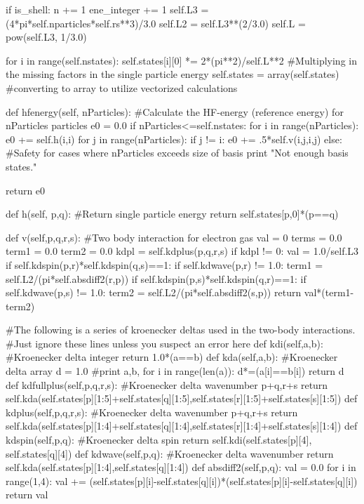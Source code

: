 \documentclass[%
oneside,                 %
final,                   %
10pt]{article}
\newenvironment{doconceexercise}{}{}
\begin{document}
\begin{doconceexercise}
            if is_shell:
                n += 1
            ene_integer += 1
        self.L3 = (4*pi*self.nparticles*self.rs**3)/3.0
        self.L2 = self.L3**(2/3.0)
        self.L = pow(self.L3, 1/3.0)
        
        for i in range(self.nstates):
            self.states[i][0] *= 2*(pi**2)/self.L**2 #Multiplying in the missing factors in the single particle energy
        self.states = array(self.states) #converting to array to utilize vectorized calculations    
        
    def hfenergy(self, nParticles):
        #Calculate the HF-energy (reference energy) for nParticles particles
        e0 = 0.0
        if nParticles<=self.nstates:
            for i in range(nParticles):
                e0 += self.h(i,i)
                for j in range(nParticles):
                    if j != i:
                        e0 += .5*self.v(i,j,i,j)
        else:
            #Safety for cases where nParticles exceeds size of basis
            print "Not enough basis states."
            
        return e0
                
    def h(self, p,q):
        #Return single particle energy
        return self.states[p,0]*(p==q)

    
    def v(self,p,q,r,s):
        #Two body interaction for electron gas
        val = 0
        terms = 0.0
        term1 = 0.0
        term2 = 0.0
        kdpl = self.kdplus(p,q,r,s)
        if kdpl != 0:
            val = 1.0/self.L3
            if self.kdspin(p,r)*self.kdspin(q,s)==1:
                if self.kdwave(p,r) != 1.0:
                    term1 = self.L2/(pi*self.absdiff2(r,p))
            if self.kdspin(p,s)*self.kdspin(q,r)==1:
                if self.kdwave(p,s) != 1.0:
                    term2 = self.L2/(pi*self.absdiff2(s,p))
        return val*(term1-term2)

    
    #The following is a series of kroenecker deltas used in the two-body interactions. 
    #Just ignore these lines unless you suspect an error here
    def kdi(self,a,b):
        #Kroenecker delta integer
        return 1.0*(a==b)
    def kda(self,a,b):
        #Kroenecker delta array
        d = 1.0
        #print a,b,
        for i in range(len(a)):
            d*=(a[i]==b[i])
        return d
    def kdfullplus(self,p,q,r,s):
        #Kroenecker delta wavenumber p+q,r+s
        return self.kda(self.states[p][1:5]+self.states[q][1:5],self.states[r][1:5]+self.states[s][1:5])
    def kdplus(self,p,q,r,s):
        #Kroenecker delta wavenumber p+q,r+s
        return self.kda(self.states[p][1:4]+self.states[q][1:4],self.states[r][1:4]+self.states[s][1:4])
    def kdspin(self,p,q):
        #Kroenecker delta spin
        return self.kdi(self.states[p][4], self.states[q][4])
    def kdwave(self,p,q):
        #Kroenecker delta wavenumber
        return self.kda(self.states[p][1:4],self.states[q][1:4])
    def absdiff2(self,p,q):
        val = 0.0
        for i in range(1,4):
            val += (self.states[p][i]-self.states[q][i])*(self.states[p][i]-self.states[q][i])
        return val


\end{doconceexercise}
\end{document}
